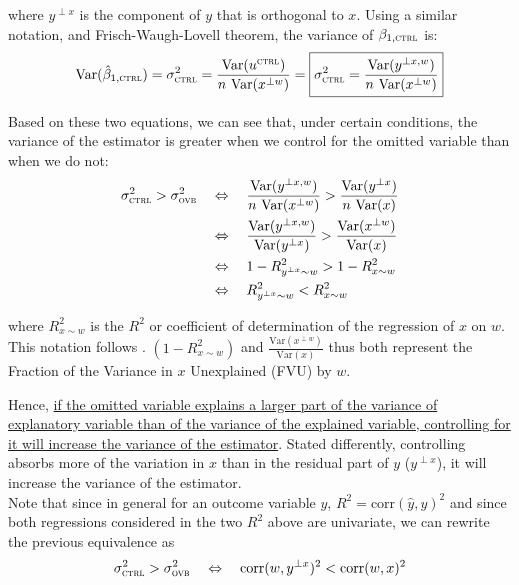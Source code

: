 \documentclass[a4paper, 11pt]{report}
\begin{document}
			where $y^{\perp x}$ is the component of $y$ that is orthogonal to $x$. Using a similar notation, and Frisch-Waugh-Lovell theorem, the variance of $\beta_{1, \textsc{ctrl}}$ is:
			~
			\[
				\text{Var} (\hat{\beta}_{1, \textsc{ctrl}}) = \sigma_{\textsc{ctrl}}^2 =
				\dfrac{\text{Var}(u^{\textsc{ctrl}})}{n \ \text{Var}(x^{\perp w})}  = 
				\boxed{
					\sigma_{\textsc{ctrl}}^2 = \dfrac{\text{Var}(y^{\perp x, w})}{n \ \text{Var}(x^{\perp w})}
				}
			\]
			
			Based on these two equations, we can see that, under certain conditions, the variance of the estimator is greater when we control for the omitted variable than when we do not:
			~
			\begin{align*}
				 \sigma_{\textsc{ctrl}}^2 >  \sigma_{\textsc{ovb}}^2 &
				 	\quad \Leftrightarrow \quad 
					 \dfrac{\text{Var}(y^{\perp x, w})}{n \ \text{Var}(x^{\perp w})} > \dfrac{\text{Var}(y^{\perp x})}{n \ \text{Var}(x)} \\
				 	& \quad \Leftrightarrow \quad 
					\dfrac{\text{Var}(y^{\perp x, w})}{\text{Var}(y^{\perp x})} > \dfrac{\text{Var}(x^{\perp w})}{\text{Var}(x)}  \\
					& \quad \Leftrightarrow \quad 
					 1 -  R^{2}_{y^{\perp x} \sim w} > 1 - R^{2}_{x \sim w}\\
				 	& \quad \Leftrightarrow \quad 
					 R^{2}_{y^{\perp x} \sim w} < R^{2}_{x \sim w}
			\end{align*}
			
			where $R^{2}_{x \sim w}$ is the $R^{2}$ or coefficient of determination of the regression of $x$ on $w$. This notation follows \cite{cinelli_making_2020}. $(1 - R^{2}_{x \sim w})$ and  $\frac{\text{Var}(x^{\perp w})}{\text{Var}(x)}$ thus both represent the Fraction of the Variance in $x$ Unexplained (FVU) by $w$. 
			
			Hence, \ul{if the omitted variable explains a larger part of the variance of explanatory variable than of the variance of the explained variable, controlling for it will increase the variance of the estimator}. Stated differently, controlling absorbs more of the variation in $x$ than in the residual part of $y$ ($y^{\perp x}$), it will increase the variance of the estimator.\\
			
			Note that since in general for an outcome variable $y$, $R^{2} = \text{corr}\left(\hat{y}, y \right)^{2}$ and since both regressions considered in the two $R^{2}$ above are univariate, we can rewrite the previous equivalence as
			~
			\[
				 \sigma_{\textsc{ctrl}}^2 >  \sigma_{\textsc{ovb}}^2 
				 	\quad \Leftrightarrow \quad 
					 \text{corr} (w, y^{\perp x})^{2} <  \text{corr} (w, x)^{2} 
			\]
			
\end{document}
